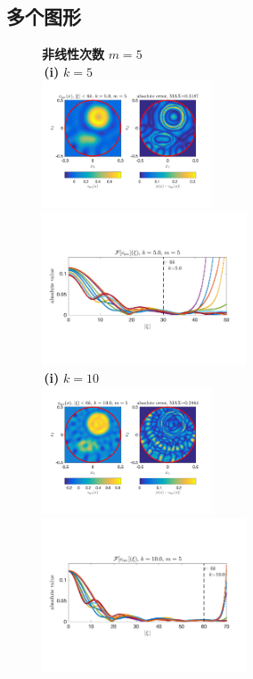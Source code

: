 \documentclass[a4paper,punct=banjiao,twoside]{ctexrep}
\theoremstyle{plain}
\theoremstyle{definition}
\theoremstyle{remark}
\begin{document}
\subsection{多个图形}
\begin{figure}[H]
\centering
\textbf{非线性次数} $m = 5$ \\[1ex]
\,\hfill \textbf{(i)} $k = 5$ \hfill\,\\
\includegraphics[width=0.45\textwidth,trim=20 60 20 35,clip]{./figs/pwc_5_Ic_0050.png}
\includegraphics[width=0.54\textwidth,trim=10 60 30 90,clip]{./figs/pwc_5_Fc_0050.png}\\
\,\hfill \textbf{(i)} $k = 10$ \hfill\,\\
\includegraphics[width=0.45\textwidth,trim=20 60 20 35,clip]{./figs/pwc_5_Ic_0100.png}
\includegraphics[width=0.54\textwidth,trim=10 60 30 90,clip]{./figs/pwc_5_Fc_0100.png}\\

\end{figure}
\end{document}
